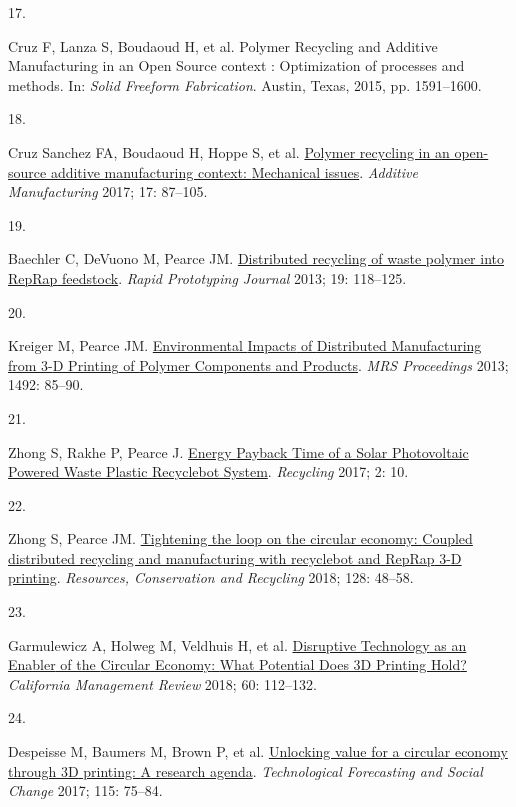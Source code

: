 \documentclass[
  11pt,
  a4paperpaper,
  onecolumn]{article}
\newlength{\cslhangindent}
\newlength{\csllabelwidth}
\newlength{\cslentryspacingunit} %
\newenvironment{CSLReferences}[2] %
 {%
  \setlength{\parindent}{0pt}
  \ifodd #1
  \let\oldpar\par
  \def\par{\hangindent=\cslhangindent\oldpar}
  \fi
  \setlength{\parskip}{#2\cslentryspacingunit}
 }%
 {}
\newcommand{\CSLLeftMargin}[1]{\parbox[t]{\csllabelwidth}{#1}}
\newcommand{\CSLRightInline}[1]{\parbox[t]{\linewidth - \csllabelwidth}{#1}\break}
\begin{document}
\begin{CSLReferences}{0}{0}
\leavevmode{}%
\CSLLeftMargin{17. }%
\CSLRightInline{Cruz F, Lanza S, Boudaoud H, et al. Polymer {Recycling}
and {Additive Manufacturing} in an {Open Source} context :
{Optimization} of processes and methods. In: \emph{Solid {Freeform
Fabrication}}. {Austin, Texas}, 2015, pp. 1591--1600.}

\leavevmode{}%
\CSLLeftMargin{18. }%
\CSLRightInline{Cruz Sanchez FA, Boudaoud H, Hoppe S, et al.
\href{https://doi.org/10.1016/j.addma.2017.05.013}{Polymer recycling in
an open-source additive manufacturing context: {Mechanical} issues}.
\emph{Additive Manufacturing} 2017; 17: 87--105.}

\leavevmode{}%
\CSLLeftMargin{19. }%
\CSLRightInline{Baechler C, DeVuono M, Pearce JM.
\href{https://doi.org/10.1108/13552541311302978}{Distributed recycling
of waste polymer into {RepRap} feedstock}. \emph{Rapid Prototyping
Journal} 2013; 19: 118--125.}

\leavevmode{}%
\CSLLeftMargin{20. }%
\CSLRightInline{Kreiger M, Pearce JM.
\href{https://doi.org/10.1557/opl.2013.319}{Environmental {Impacts} of
{Distributed Manufacturing} from 3-{D Printing} of {Polymer Components}
and {Products}}. \emph{MRS Proceedings} 2013; 1492: 85--90.}

\leavevmode{}%
\CSLLeftMargin{21. }%
\CSLRightInline{Zhong S, Rakhe P, Pearce J.
\href{https://doi.org/10.3390/recycling2020010}{Energy {Payback Time} of
a {Solar Photovoltaic Powered Waste Plastic Recyclebot System}}.
\emph{Recycling} 2017; 2: 10.}

\leavevmode{}%
\CSLLeftMargin{22. }%
\CSLRightInline{Zhong S, Pearce JM.
\href{https://doi.org/10.1016/j.resconrec.2017.09.023}{Tightening the
loop on the circular economy: {Coupled} distributed recycling and
manufacturing with recyclebot and {RepRap} 3-{D} printing}.
\emph{Resources, Conservation and Recycling} 2018; 128: 48--58.}

\leavevmode{}%
\CSLLeftMargin{23. }%
\CSLRightInline{Garmulewicz A, Holweg M, Veldhuis H, et al.
\href{https://doi.org/10.1177/0008125617752695}{Disruptive {Technology}
as an {Enabler} of the {Circular Economy}: {What Potential Does 3D
Printing Hold}?} \emph{California Management Review} 2018; 60:
112--132.}

\leavevmode{}%
\CSLLeftMargin{24. }%
\CSLRightInline{Despeisse M, Baumers M, Brown P, et al.
\href{https://doi.org/10.1016/j.techfore.2016.09.021}{Unlocking value
for a circular economy through {3D} printing: {A} research agenda}.
\emph{Technological Forecasting and Social Change} 2017; 115: 75--84.}


\end{CSLReferences}
\end{document}
